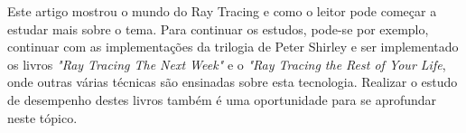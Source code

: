 \documentclass[journal]{IEEEtran}
\begin{document}
Este artigo mostrou o mundo do Ray Tracing e como o leitor pode começar a estudar mais sobre o tema. Para continuar
os estudos, pode-se por exemplo, continuar com as implementações da trilogia de Peter Shirley e ser implementado
os livros \emph{"Ray Tracing The Next Week"} e o \emph{"Ray Tracing the Rest of Your Life}, onde outras várias 
técnicas são ensinadas sobre esta tecnologia. Realizar o estudo de desempenho destes livros também é uma oportunidade
para se aprofundar neste tópico.




\end{document}
